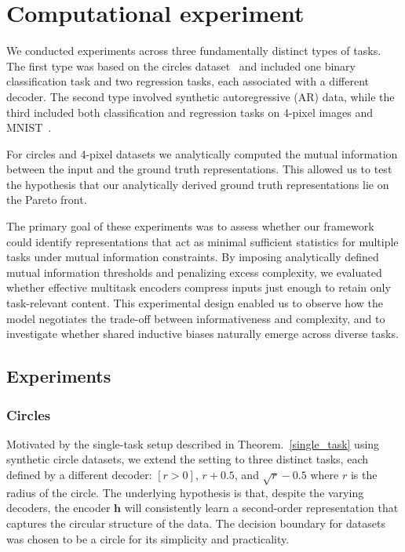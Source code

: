 \documentclass[14pt]{extarticle}
\begin{document}
\section{Computational experiment}
    We conducted experiments across three fundamentally distinct types of tasks. The first type was based on the circles dataset~\citep{scikit-learn} and included one binary classification task and two regression tasks, each associated with a different decoder. The second type involved synthetic autoregressive (AR) data, while the third included both classification and regression tasks on 4-pixel images and MNIST~\citep{mnist}. 

    For circles and 4-pixel datasets we analytically computed the mutual information between the input and the ground truth representations. This allowed us to test the hypothesis that our analytically derived ground truth representations lie on the Pareto front. 

    The primary goal of these experiments was to assess whether our framework could identify representations that act as minimal sufficient statistics for multiple tasks under mutual information constraints. By imposing analytically defined mutual information thresholds and penalizing excess complexity, we evaluated whether effective multitask encoders compress inputs just enough to retain only task-relevant content. This experimental design enabled us to observe how the model negotiates the trade-off between informativeness and complexity, and to investigate whether shared inductive biases naturally emerge across diverse tasks.
    \subsection{Experiments}
    \subsubsection{Circles}
        Motivated by the single-task setup described in Theorem.~\ref{single_task} using synthetic circle datasets, we extend the setting to three distinct tasks, each defined by a different decoder: \([r > 0]\), \(r + 0.5\), and \(\sqrt{r} - 0.5\) where \(r\) is the radius of the circle. The underlying hypothesis is that, despite the varying decoders, the encoder \(\mathbf{h}\) will consistently learn a second-order representation that captures the circular structure of the data. The decision boundary for datasets was chosen to be a circle for its simplicity and practicality. 
\end{document}
